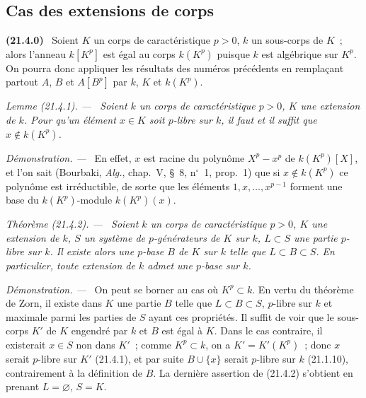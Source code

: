 \documentclass[10pt,oneside]{book}
\makeatletter
\newcommand{\setmanualcurrentlabel}[1]{\def\@currentlabel{#1}}
\newenvironment{env}[1][]{\setmanualcurrentlabel{#1}\par\medskip\noindent\textbf{(#1)}\ }{\par}
\newenvironment{theorem}[1][]{%
  \setmanualcurrentlabel{#1}\par\medskip\noindent\itshape Théorème (#1). ---\ }{\par}
\newenvironment{lemma}[1][]{%
  \setmanualcurrentlabel{#1}\par\medskip\noindent\itshape Lemme (#1). ---\ }{\par}
\newenvironment{proof}{%
  \par\medskip\noindent\textit{Démonstration. ---\ }}{\par}
\makeatother
\begin{document}
\subsection{Cas des extensions de corps}
\label{0.21.4-fr}

\begin{env}[21.4.0]
\label{0.21.4.0-fr}
Soient $K$ un corps de caractéristique $p>0$, $k$ un sous-corps de $K$~;
alors l'anneau $k[K^p]$ est égal au corps $k(K^p)$ puisque $k$ est algébrique
sur $K^p$. On pourra donc appliquer les résultats des numéros précédents en
remplaçant partout $A$, $B$ et $A[B^p]$ par $k$, $K$ et $k(K^p)$.
\end{env}

\begin{lemma}[21.4.1]
\label{0.21.4.1-fr}
Soient $k$ un corps de caractéristique $p>0$, $K$ une extension de $k$.
Pour qu'un élément $x\in K$ soit $p$-libre sur $k$, il faut et il suffit que
$x\notin k(K^p)$.
\end{lemma}

\begin{proof}
En effet, $x$ est racine du polynôme $X^p-x^p$ de $k(K^p)[X]$, et l'on sait
(Bourbaki, \emph{Alg.}, chap.~V, §~8, n$^\circ$~1, prop.~1) que si
$x\notin k(K^p)$ ce polynôme est irréductible, de sorte que les éléments
$1,x,\ldots,x^{p-1}$ forment une base du $k(K^p)$-module $k(K^p)(x)$.
\end{proof}

\begin{theorem}[21.4.2]
\label{0.21.4.2-fr}
Soient $k$ un corps de caractéristique $p>0$, $K$ une extension de $k$,
$S$ un système de $p$-générateurs de $K$ sur $k$, $L\subset S$ une partie
$p$-libre sur $k$. Il existe alors une $p$-base $B$ de $K$ sur $k$ telle que
$L\subset B\subset S$. En particulier, toute extension de $k$ admet une
$p$-base sur $k$.
\end{theorem}

\begin{proof}
On peut se borner au cas où $K^p\subset k$. En vertu du théorème de Zorn,
il existe dans $K$ une partie $B$ telle que $L\subset B\subset S$, $p$-libre
sur $k$ et maximale parmi les parties de $S$ ayant ces propriétés. Il suffit
de voir que le sous-corps $K'$ de $K$ engendré par $k$ et $B$ est égal à $K$.
Dans le cas contraire, il existerait $x\in S$ non dans $K'$~; comme
$K^p\subset k$, on a $K'=K'(K^p)$~; donc $x$ serait $p$-libre sur $K'$
(21.4.1), et par suite $B\cup\{x\}$ serait $p$-libre sur $k$ (21.1.10),
contrairement à la définition de $B$. La dernière assertion de (21.4.2)
s'obtient en prenant $L=\varnothing$, $S=K$.
\end{proof}
\end{document}
